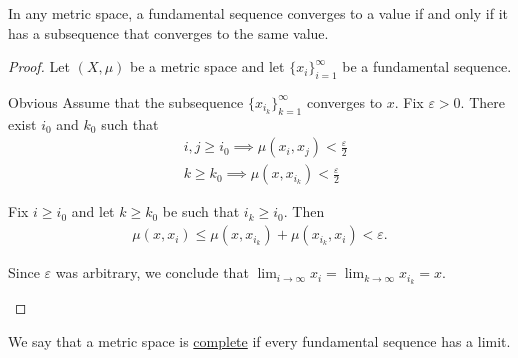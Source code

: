 \begin{proposition}\label{thm:fundamental_subsequence_convergence}
  In any metric space, a fundamental sequence converges to a value if and only if it has a subsequence that converges to the same value.
\end{proposition}
\begin{proof}
  Let $(X, \mu)$ be a metric space and let $\{ x_i \}_{i=1}^\infty$ be a fundamental sequence.

  \begin{description}
    \Implies Obvious
    \ImpliedBy Assume that the subsequence $\{ x_{i_k} \}_{k=1}^\infty$ converges to $x$. Fix $\varepsilon > 0$. There exist $i_0$ and $k_0$ such that
    \begin{align*}
      &i, j \geq i_0 \implies \mu(x_i, x_j) < \tfrac \varepsilon 2 \\
      &k \geq k_0 \implies \mu(x, x_{i_k}) < \tfrac \varepsilon 2
    \end{align*}

    Fix $i \geq i_0$ and let $k \geq k_0$ be such that $i_k \geq i_0$. Then
    \begin{align*}
      \mu(x, x_i) \leq \mu(x, x_{i_k}) + \mu(x_{i_k}, x_i) < \varepsilon.
    \end{align*}

    Since $\varepsilon$ was arbitrary, we conclude that $\lim_{i \to \infty} x_i = \lim_{k \to \infty} x_{i_k} = x$.
  \end{description}
\end{proof}

\begin{definition}\label{def:complete_metric_space}
  We say that a metric space is \ul{complete} if every fundamental sequence has a limit.
\end{definition}

